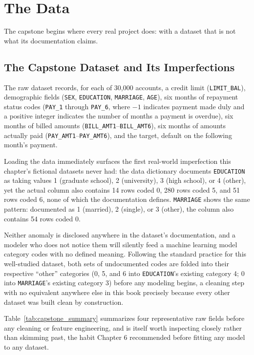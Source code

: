 \documentclass[../ai_in_finance]{subfiles}
\begin{document}
\section{The Data}

The capstone begins where every real project does: with a dataset that is not what its documentation claims.

\subsection{The Capstone Dataset and Its Imperfections}
\label{sec:capstone-data}

The raw dataset records, for each of 30,000 accounts, a credit limit (\texttt{LIMIT\_BAL}), demographic fields (\texttt{SEX}, \texttt{EDUCATION}, \texttt{MARRIAGE}, \texttt{AGE}), six months of repayment status codes (\texttt{PAY\_1} through \texttt{PAY\_6}, where $-1$ indicates payment made duly and a positive integer indicates the number of months a payment is overdue), six months of billed amounts (\texttt{BILL\_AMT1}--\texttt{BILL\_AMT6}), six months of amounts actually paid (\texttt{PAY\_AMT1}--\texttt{PAY\_AMT6}), and the target, default on the following month's payment.

Loading the data immediately surfaces the first real-world imperfection this chapter's fictional datasets never had: the data dictionary documents \texttt{EDUCATION} as taking values 1 (graduate school), 2 (university), 3 (high school), or 4 (other), yet the actual column also contains 14 rows coded 0, 280 rows coded 5, and 51 rows coded 6, none of which the documentation defines. \texttt{MARRIAGE} shows the same pattern: documented as 1 (married), 2 (single), or 3 (other), the column also contains 54 rows coded 0.

Neither anomaly is disclosed anywhere in the dataset's documentation, and a modeler who does not notice them will silently feed a machine learning model category codes with no defined meaning. Following the standard practice for this well-studied dataset, both sets of undocumented codes are folded into their respective ``other'' categories (0, 5, and 6 into \texttt{EDUCATION}'s existing category 4; 0 into \texttt{MARRIAGE}'s existing category 3) before any modeling begins, a cleaning step with no equivalent anywhere else in this book precisely because every other dataset was built clean by construction.

Table~\ref{tab:capstone_summary} summarizes four representative raw fields before any cleaning or feature engineering, and is itself worth inspecting closely rather than skimming past, the habit Chapter 6 recommended before fitting any model to any dataset.
\end{document}
